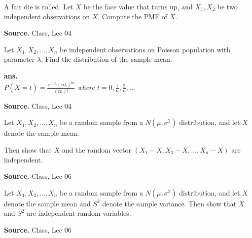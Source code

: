 \documentclass[12pt,twoside]{report}
\newenvironment*{ans}{\textbf{ans.}\space\em\\}{\par}
\newenvironment*{source}{\hfill\scriptsize\textbf{Source.}\space}{\par}
\begin{document}
\begin{samepage}
\begin{ex}
A fair die is rolled. Let $X$ be the face value that turns up, and $X_1, X_2$ be two independent observations on $X$. Compute the PMF of $\bar{X}$.
\end{ex}
\begin{source}
Class, Lec 04
\end{source}
\end{samepage}

\begin{samepage}
\begin{ex}
Let $X_1, X_2, ..., X_n$ be independent observations on Poisson population with parameter $\lambda$. Find the distribution of the sample mean.
\end{ex}
\begin{ans}
$P(\bar{X} = t) = \displaystyle \frac{e^{-n \lambda} (n \lambda)^{tn}}{(tn)!}$ where $t = 0, \frac{1}{n}, \frac{2}{n}, ...$
\end{ans}
\begin{source}
Class, Lec 04
\end{source}
\end{samepage}

\begin{samepage}
\begin{ex}
Let $X_1, X_2, . . . , X_n$ be a random sample from a $N(\mu, \sigma^2)$ distribution, and let $X$ denote the sample mean.

Then show that $X$ and the random vector $(X_1 - X, X_2 - X, . . . , X_n - X)$ are independent.
\end{ex}
\begin{source}
Class, Lec 06
\end{source}
\end{samepage}

\begin{samepage}
\begin{ex}
Let $X_1, X_2, . . . , X_n$ be a random sample from a $N(\mu, \sigma^2)$ distribution, and let $X$ denote the sample mean and $S^2$ denote the sample variance. Then show that $X$ and $S^2$ are independent random variables.
\end{ex}
\begin{source}
Class, Lec 06
\end{source}
\end{samepage}
\end{document}
